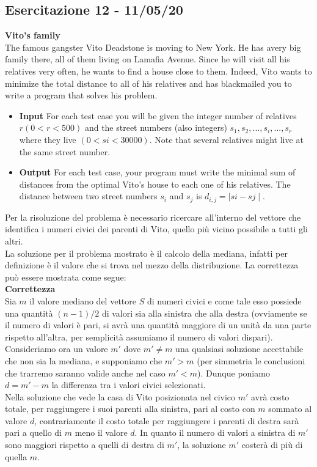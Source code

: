 \documentclass[../cheatSheetAlgoritmi.tex]{subfiles}
\begin{document}
\subsection{Esercitazione 12 - 11/05/20}
\textbf{Vito's family} \\
The famous gangster Vito Deadstone is moving to New York. He has avery big family there, all of them living on Lamafia Avenue. Since he will visit all his relatives very often, he wants to find a house close to them. Indeed, Vito wants to minimize the total distance to all of his relatives and has blackmailed you to write a program that solves his problem.
\begin{itemize}
	\item \textbf{Input} For each test case you will be given the integer number of relatives $r(0 < r < 500)$ and the street numbers (also integers) $s_1, s_2, ..., s_i, ..., s_r$ where they live $(0< si<30000)$. Note that several relatives might live at the same street number.
	\item \textbf{Output} For each test case, your program must write the minimal sum of distances from the optimal Vito's house to each one of his relatives. The distance between two street numbers $s_i$ and $s_j$ is $d_{i,j}= \mid si - sj \mid$.
\end{itemize}
Per la risoluzione del problema è necessario ricercare all'interno del vettore che identifica i numeri civici dei parenti di Vito, quello più vicino possibile a tutti gli altri. \\ 
La soluzione per il problema mostrato è il calcolo della mediana, infatti per definizione è il valore che si trova nel mezzo della distribuzione. La correttezza può essere mostrata come segue: \\
\textbf{Correttezza} \\
Sia $m$ il valore mediano del vettore $S$ di numeri civici e come tale esso possiede una quantità $(n - 1)/2$ di valori sia alla sinistra che alla destra (ovviamente se il numero di valori è pari, si avrà una quantità maggiore di un unità da una parte rispetto all'altra, per semplicità assumiamo il numero di valori dispari). \\
Consideriamo ora un valore $m'$ dove $m' \neq m$ una qualsiasi soluzione accettabile che non sia la mediana, e supponiamo che $m' > m$ (per simmetria le conclusioni che trarremo saranno valide anche nel caso $m' < m$). Dunque poniamo $d = m' - m$ la differenza tra i valori civici selezionati. \\
Nella soluzione che vede la casa di Vito posizionata nel civico $m'$ avrà costo totale, per raggiungere i suoi parenti alla sinistra, pari al costo con $m$ sommato al valore $d$, contrariamente il costo totale per raggiungere i parenti di destra sarà pari a quello di $m$ meno il valore $d$. In quanto il numero di valori a sinistra di $m'$  sono maggiori rispetto a quelli di destra di $m'$, la soluzione $m'$ costerà di più di quella $m$. \\
\end{document}
